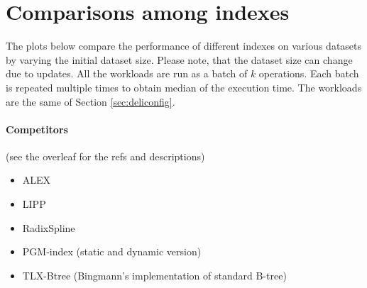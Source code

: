 \documentclass{article}
\begin{document}


\section{Comparisons among indexes}
The plots below compare the performance of different indexes on various datasets by varying the initial dataset size. Please note, that the dataset size can change due to updates. 
All the workloads are run as a batch of $k$ operations. Each batch is repeated multiple times to obtain median of the execution time.
The workloads are the same of Section \ref{sec:deliconfig}.
\paragraph*{Competitors} (see the overleaf for the refs and descriptions)
\begin{itemize}
  \item ALEX
  \item LIPP
  \item RadixSpline
  \item PGM-index (static and dynamic version)
  \item TLX-Btree (Bingmann's implementation of standard B-tree)
\end{itemize}
\end{document}
